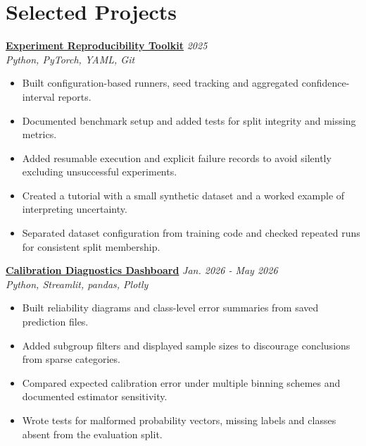 \documentclass[11pt,a4paper]{article}
\begin{document}
\section{Selected Projects}
\textbf{\href{https://example.com/demos/reproducibility}{Experiment Reproducibility Toolkit}} \hfill \textit{2025}\\
\textit{Python, PyTorch, YAML, Git}
\begin{itemize}[leftmargin=*,noitemsep,topsep=2pt]
\item Built configuration-based runners, seed tracking and aggregated confidence-interval reports.
\item Documented benchmark setup and added tests for split integrity and missing metrics.
\item Added resumable execution and explicit failure records to avoid silently excluding unsuccessful experiments.
\item Created a tutorial with a small synthetic dataset and a worked example of interpreting uncertainty.
\item Separated dataset configuration from training code and checked repeated runs for consistent split membership.
\end{itemize}

\textbf{\href{https://example.com/demos/calibration-dashboard}{Calibration Diagnostics Dashboard}} \hfill \textit{Jan. 2026 - May 2026}\\
\textit{Python, Streamlit, pandas, Plotly}
\begin{itemize}[leftmargin=*,noitemsep,topsep=2pt]
\item Built reliability diagrams and class-level error summaries from saved prediction files.
\item Added subgroup filters and displayed sample sizes to discourage conclusions from sparse categories.
\item Compared expected calibration error under multiple binning schemes and documented estimator sensitivity.
\item Wrote tests for malformed probability vectors, missing labels and classes absent from the evaluation split.
\end{itemize}
\end{document}
